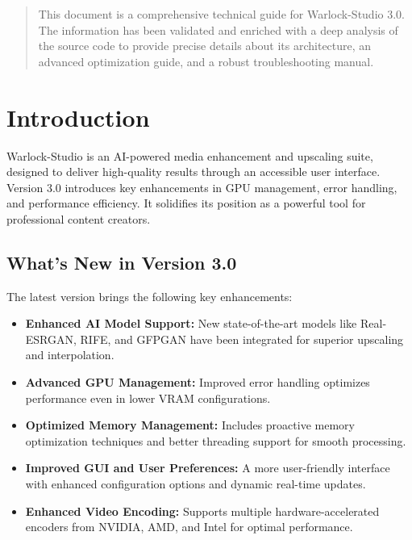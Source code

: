 \documentclass[11pt, a4paper]{article}
\begin{document}
\begin{abstract}
\noindent %
This document is a comprehensive technical guide for Warlock-Studio 3.0. The information has been validated and enriched with a deep analysis of the source code to provide precise details about its architecture, an advanced optimization guide, and a robust troubleshooting manual.
\end{abstract}

\newpage %
\tableofcontents %
\newpage %



\section{Introduction}
Warlock-Studio is an AI-powered media enhancement and upscaling suite, designed to deliver high-quality results through an accessible user interface. Version 3.0 introduces key enhancements in GPU management, error handling, and performance efficiency. It solidifies its position as a powerful tool for professional content creators.

\subsection{What's New in Version 3.0}
The latest version brings the following key enhancements:
\begin{itemize}[leftmargin=*]
    \item \textbf{Enhanced AI Model Support:} New state-of-the-art models like Real-ESRGAN, RIFE, and GFPGAN have been integrated for superior upscaling and interpolation.
    \item \textbf{Advanced GPU Management:} Improved error handling optimizes performance even in lower VRAM configurations.
    \item \textbf{Optimized Memory Management:} Includes proactive memory optimization techniques and better threading support for smooth processing.
    \item \textbf{Improved GUI and User Preferences:} A more user-friendly interface with enhanced configuration options and dynamic real-time updates.
    \item \textbf{Enhanced Video Encoding:} Supports multiple hardware-accelerated encoders from NVIDIA, AMD, and Intel for optimal performance.
\end{itemize}
\end{document}
